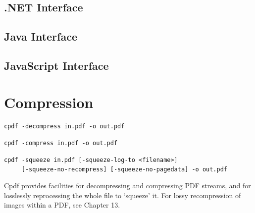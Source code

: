 \documentclass{book}
\begin{document}
\begin{dotnetcpdflib}
\clearpage
\section*{.NET Interface}
\begin{small}\tt

\end{small}
\end{dotnetcpdflib}

\begin{jcpdflib}
\clearpage
\section*{Java Interface}
\begin{small}\tt

\end{small}
\end{jcpdflib}

\begin{jscpdflib}
\clearpage
\section*{JavaScript Interface}
\begin{small}\tt

\end{small}
\end{jscpdflib}

\chapter{Compression}\label{chap:5}

  \begin{framed}
     \small\noindent\verb!cpdf -decompress in.pdf -o out.pdf!

     \vspace{1.5mm}
     \noindent\verb!cpdf -compress in.pdf -o out.pdf!
     
     \vspace{1.5mm}
     \noindent\verb!cpdf -squeeze in.pdf [-squeeze-log-to <filename>]!\\
     \noindent\verb!     [-squeeze-no-recompress] [-squeeze-no-pagedata] -o out.pdf!   
   \end{framed}

  Cpdf provides facilities for decompressing and compressing PDF streams, and for losslessly reprocessing the whole file to `squeeze' it. For lossy recompression of images within a PDF, see Chapter 13.
\end{document}
